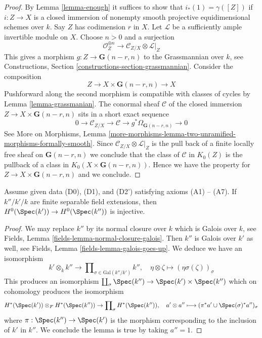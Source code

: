 \begin{proof}
By Lemma \ref{lemma-enough} it suffices to show that $i_*(1) = \gamma([Z])$
if $i : Z \to X$ is a closed immersion of nonempty
smooth projective equidimensional
schemes over $k$. Say $Z$ has codimension $r$ in $X$.
Let $\mathcal{L}$ be a sufficiently ample invertible module on $X$.
Choose $n > 0$ and a surjection
$$
\mathcal{O}_Z^{\oplus n} \to \mathcal{C}_{Z/X} \otimes \mathcal{L}|_Z
$$
This gives a morphism $g : Z \to \mathbf{G}(n - r, n)$
to the Grassmannian over $k$, see
Constructions, Section \ref{constructions-section-grassmannian}.
Consider the composition
$$
Z \to X \times \mathbf{G}(n - r, n) \to X
$$
Pushforward along the second morphism is compatible with classes
of cycles by Lemma \ref{lemma-grassmanian}. The conormal sheaf $\mathcal{C}$
of the closed immersion $Z \to X \times \mathbf{G}(n - r, n)$ sits in
a short exact sequence
$$
0 \to \mathcal{C}_{Z/X} \to \mathcal{C} \to
g^*\Omega_{\mathbf{G}(n - r, n)} \to 0
$$
See More on Morphisms, Lemma
\ref{more-morphisms-lemma-two-unramified-morphisms-formally-smooth}.
Since $\mathcal{C}_{Z/X} \otimes \mathcal{L}|_Z$ is the pull
back of a finite locally free sheaf on $\mathbf{G}(n - r, n)$
we conclude that the class of $\mathcal{C}$ in $K_0(Z)$
is the pullback of a class in $K_0(X \times \mathbf{G}(n - r, n))$.
Hence we have the property for $Z \to X \times \mathbf{G}(n - r, n)$
and we conclude.
\end{proof}

\begin{lemma}
\label{lemma-injective-H0}
Assume given data (D0), (D1), and (D2') satisfying axioms (A1) -- (A7).
If $k''/k'/k$ are finite separable field extensions, then
$H^0(\Spec(k')) \to H^0(\Spec(k''))$ is injective.
\end{lemma}

\begin{proof}
We may replace $k''$ by its normal closure over $k$
which is Galois over $k$, see
Fields, Lemma \ref{fields-lemma-normal-closure-galois}.
Then $k''$ is Galois over $k'$ as well, see
Fields, Lemma \ref{fields-lemma-galois-goes-up}.
We deduce we have an isomorphism
$$
k' \otimes_k k'' \longrightarrow
\prod\nolimits_{\sigma \in \text{Gal}(k''/k')} k'',\quad
\eta \otimes \zeta \longmapsto (\eta \sigma(\zeta))_\sigma
$$
This produces an isomorphism
$\coprod_\sigma \Spec(k'') \to \Spec(k') \times \Spec(k'')$
which on cohomology produces the isomorphism
$$
H^*(\Spec(k')) \otimes_F H^*(\Spec(k''))
\to
\prod\nolimits_\sigma H^*(\Spec(k'')),\quad
a' \otimes a'' \longmapsto (\pi^*a' \cup \Spec(\sigma)^*a'')_\sigma
$$
where $\pi : \Spec(k'') \to \Spec(k')$ is the morphism
corresponding to the inclusion of $k'$ in $k''$.
We conclude the lemma is true by taking $a'' = 1$.
\end{proof}

